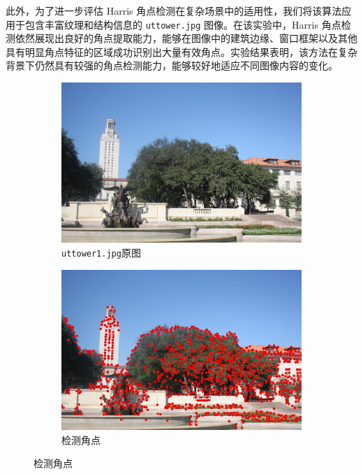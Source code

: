 \documentclass[a4paper, utf8]{ctexart}
\begin{document}
	此外，为了进一步评估 Harris 角点检测在复杂场景中的适用性，我们将该算法应用于包含丰富纹理和结构信息的 \verb|uttower.jpg| 图像。在该实验中，Harris 角点检测依然展现出良好的角点提取能力，能够在图像中的建筑边缘、窗口框架以及其他具有明显角点特征的区域成功识别出大量有效角点。实验结果表明，该方法在复杂背景下仍然具有较强的角点检测能力，能够较好地适应不同图像内容的变化。
	
	\begin{figure}[htbp]
		\centering
		\begin{subfigure}{.45\textwidth}
			\centering
			\includegraphics[height=.15\textheight]{./figure/uttower1.jpg}
			\caption{\texttt{uttower1.jpg}原图}
		\end{subfigure}
		\begin{subfigure}{.45\textwidth}
			\centering
			\includegraphics[height=.15\textheight]{./figure/uttower1_keypoints.jpg}
			\caption{检测角点}
		\end{subfigure}
		

\end{figure}
\end{document}
